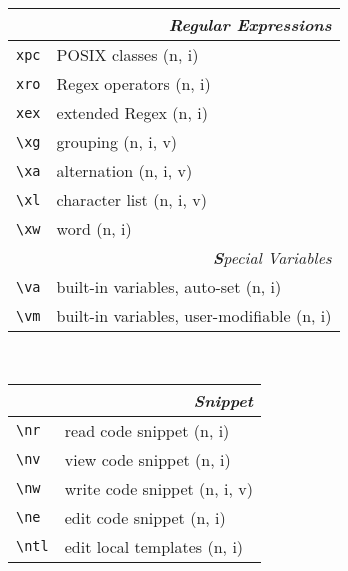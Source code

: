 \documentclass[oneside,10pt,landscape,DIV16]{scrartcl}
\begin{document}
\begin{multicols}{3}
\begin{center}
\begin{tabular}[]{|p{11mm}|p{60mm}|}
\hline
\multicolumn{2}{|r|}{\textsl{Regular E\textbf{x}pressions}}     \\[1.0ex]
\hline     \verb'xpc' &  POSIX classes                 \hfill (n, i)\\ 
\hline     \verb'xro' &  Regex operators               \hfill (n, i)\\ 
\hline     \verb'xex' &  extended Regex                \hfill (n, i)\\ 
\hline     \verb'\xg' &  grouping                      \hfill (n, i, v)   \\
\hline     \verb'\xa' &  alternation                   \hfill (n, i, v)   \\
\hline     \verb'\xl' &  character list                \hfill (n, i, v)   \\
\hline     \verb'\xw' &  word                          \hfill (n, i)   \\
\hline
\hline
\multicolumn{2}{|r|}{\textsl{\textbf{S}pecial Variables}}            \\[1.0ex]
\hline \verb'\va'   & built-in variables, auto-set        \hfill (n, i)\\
\hline \verb'\vm'   & built-in variables, user-modifiable \hfill (n, i)\\
\hline
%
\end{tabular}\\
%
%
\begin{tabular}[]{|p{11mm}|p{62mm}|}
\hline
\multicolumn{2}{|r|}{\textsl{S\textbf{n}ippet}}                \\[1.0ex]
\hline \verb'\nr'  & read code snippet         \hfill (n, i)   \\
\hline \verb'\nv'  & view code snippet         \hfill (n, i)   \\
\hline \verb'\nw'  & write code snippet        \hfill (n, i, v)\\
\hline \verb'\ne'  & edit code snippet         \hfill (n, i)   \\
%
\hline     \verb'\ntl' & edit local templates      \hfill (n, i)\\

\end{tabular}
\end{center}
\end{multicols}
\end{document}

